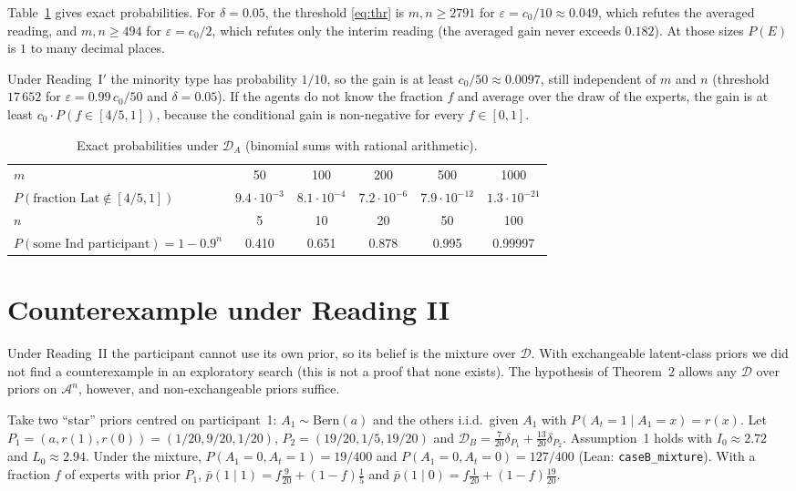 \documentclass[11pt]{article}
\theoremstyle{remark}
\newcommand{\cD}{\mathcal{D}}
\newcommand{\cA}{\mathcal{A}}
\newcommand{\Lat}{\mathrm{Lat}}
\newcommand{\Ind}{\mathrm{Ind}}
\newcommand{\pb}{\bar p}
\begin{document}
Table~\ref{tab:probs} gives exact probabilities. For $\delta=0.05$, the threshold \eqref{eq:thr} is $m,n\ge2791$ for $\varepsilon=c_0/10\approx0.049$, which refutes the averaged reading, and $m,n\ge494$ for $\varepsilon=c_0/2$, which refutes only the interim reading (the averaged gain never exceeds $0.182$). At those sizes $P(E)$ is $1$ to many decimal places.

Under Reading~I$'$ the minority type has probability $1/10$, so the gain is at least $c_0/50\approx0.0097$, still independent of $m$ and $n$ (threshold $17\,652$ for $\varepsilon=0.99\,c_0/50$ and $\delta=0.05$). If the agents do not know the fraction $f$ and average over the draw of the experts, the gain is at least $c_0\cdot P(f\in[4/5,1])$, because the conditional gain is non-negative for every $f\in[0,1]$.

\begin{table}[h]
\centering\small
\begin{tabular}{lccccc}
\toprule
$m$ & 50 & 100 & 200 & 500 & 1000\\
$P(\text{fraction }\Lat\notin[4/5,1])$ &$9.4\cdot10^{-3}$ & $8.1\cdot10^{-4}$ & $7.2\cdot10^{-6}$ & $7.9\cdot10^{-12}$ & $1.3\cdot10^{-21}$\\
\midrule
$n$ & 5 & 10 & 20 & 50 & 100\\
$P(\text{some }\Ind\text{ participant})=1-0.9^n$ &0.410 & 0.651 & 0.878 & 0.995 & 0.99997\\
\bottomrule
\end{tabular}
\caption{Exact probabilities under $\cD_A$ (binomial sums with rational arithmetic).}\label{tab:probs}
\end{table}

\section{Counterexample under Reading II}\label{sec:caseB}

Under Reading~II the participant cannot use its own prior, so its belief is the mixture over $\cD$. With exchangeable latent-class priors we did not find a counterexample in an exploratory search (this is not a proof that none exists). The hypothesis of Theorem~2 allows any $\cD$ over priors on $\cA^n$, however, and non-exchangeable priors suffice.

Take two ``star'' priors centred on participant~1: $A_1\sim\mathrm{Bern}(a)$ and the others i.i.d.\ given $A_1$ with $P(A_t{=}1\mid A_1{=}x)=r(x)$. Let $P_1=(a,r(1),r(0))=(1/20,9/20,1/20)$, $P_2=(19/20,1/5,19/20)$ and $\cD_B=\tfrac{7}{20}\delta_{P_1}+\tfrac{13}{20}\delta_{P_2}$. Assumption~1 holds with $I_0\approx2.72$ and $L_0\approx2.94$. Under the mixture, $P(A_1{=}0,A_t{=}1)=19/400$ and $P(A_1{=}0,A_t{=}0)=127/400$ (Lean: \texttt{caseB\_mixture}). With a fraction $f$ of experts with prior $P_1$, $\pb(1\mid1)=f\tfrac{9}{20}+(1-f)\tfrac15$ and $\pb(1\mid0)=f\tfrac1{20}+(1-f)\tfrac{19}{20}$.
\end{document}
